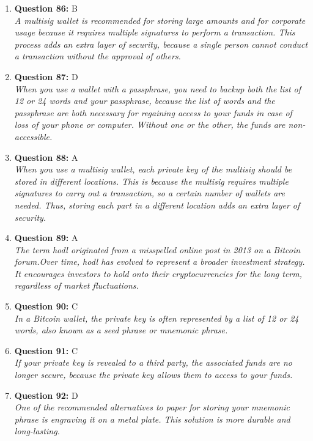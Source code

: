 \documentclass[12pt,a4paper]{article}
\begin{document}
\begin{enumerate}
\item \textbf{Question 86:} B
\\ \textit{A multisig wallet is recommended for storing large amounts and for corporate usage because it requires multiple signatures to perform a transaction. This process adds an extra layer of security, because a single person cannot conduct a transaction without the approval of others.}

\item \textbf{Question 87:} D
\\ \textit{When you use a wallet with a passphrase, you need to backup both the list of 12 or 24 words and your passphrase, because the list of words and the passphrase are both necessary for regaining access to your funds in case of loss of your phone or computer. Without one or the other, the funds are non-accessible.}

\item \textbf{Question 88:} A
\\ \textit{When you use a multisig wallet, each private key of the multisig should be stored in different locations. This is because the multisig requires multiple signatures to carry out a transaction, so a certain number of wallets are needed. Thus, storing each part in a different location adds an extra layer of security.}

\item \textbf{Question 89:} A
\\ \textit{The term hodl originated from a misspelled online post in 2013 on a Bitcoin forum.Over time, hodl has evolved to represent a broader investment strategy. It encourages investors to hold onto their cryptocurrencies for the long term, regardless of market fluctuations.}

\item \textbf{Question 90:} C
\\ \textit{In a Bitcoin wallet, the private key is often represented by a list of 12 or 24 words, also known as a seed phrase or mnemonic phrase.}

\item \textbf{Question 91:} C
\\ \textit{If your private key is revealed to a third party, the associated funds are no longer secure, because the private key allows them to access to your funds.}

\item \textbf{Question 92:} D
\\ \textit{One of the recommended alternatives to paper for storing your mnemonic phrase is engraving it on a metal plate. This solution is more durable and long-lasting.}


\end{enumerate}
\end{document}
